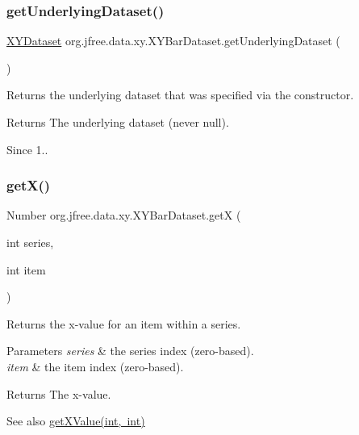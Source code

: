 \subsubsection{\texorpdfstring{get\+Underlying\+Dataset()}{getUnderlyingDataset()}}
{\footnotesize\ttfamily \mbox{\hyperlink{interfaceorg_1_1jfree_1_1data_1_1xy_1_1_x_y_dataset}{X\+Y\+Dataset}} org.\+jfree.\+data.\+xy.\+X\+Y\+Bar\+Dataset.\+get\+Underlying\+Dataset (\begin{DoxyParamCaption}{ }\end{DoxyParamCaption})}

Returns the underlying dataset that was specified via the constructor.

\begin{DoxyReturn}{Returns}
The underlying dataset (never {\ttfamily null}).
\end{DoxyReturn}
\begin{DoxySince}{Since}
1.. 
\end{DoxySince}
\mbox{\label{classorg_1_1jfree_1_1data_1_1xy_1_1_x_y_bar_dataset_a517abc432ea872cbd470288b17725337}} 
\subsubsection{\texorpdfstring{get\+X()}{getX()}}
{\footnotesize\ttfamily Number org.\+jfree.\+data.\+xy.\+X\+Y\+Bar\+Dataset.\+getX (\begin{DoxyParamCaption}\item[{int}]{series,  }\item[{int}]{item }\end{DoxyParamCaption})}

Returns the x-\/value for an item within a series.


\begin{DoxyParams}{Parameters}
{\em series} & the series index (zero-\/based). \\
\hline
{\em item} & the item index (zero-\/based).\\
\hline
\end{DoxyParams}
\begin{DoxyReturn}{Returns}
The x-\/value.
\end{DoxyReturn}
\begin{DoxySeeAlso}{See also}
\mbox{\hyperlink{classorg_1_1jfree_1_1data_1_1xy_1_1_x_y_bar_dataset_a84dba23fe8e4a19faff04e32a4bc0ea3}{get\+X\+Value(int, int)}} 
\end{DoxySeeAlso}


